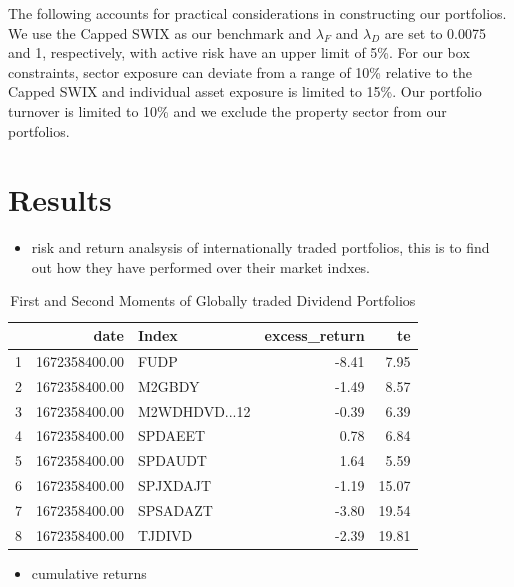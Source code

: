 \documentclass[11pt,preprint, authoryear]{elsarticle}
\numberwithin{equation}{section}
\numberwithin{figure}{section}
\numberwithin{table}{section}
\def\tightlist{} %
\begin{document}
The following accounts for practical considerations in constructing our
portfolios. We use the Capped SWIX as our benchmark and \(\lambda_F\)
and \(\lambda_D\) are set to 0.0075 and 1, respectively, with active
risk have an upper limit of 5\%. For our box constraints, sector
exposure can deviate from a range of 10\% relative to the Capped SWIX
and individual asset exposure is limited to 15\%. Our portfolio turnover
is limited to 10\% and we exclude the property sector from our
portfolios. \newpage

\hypertarget{results}{%
\section*{Results}\label{results}}

\begin{itemize}
\tightlist
\item
  risk and return analsysis of internationally traded portfolios, this
  is to find out how they have performed over their market indxes.
\end{itemize}

\begin{longtable}{rrlrr}
\caption{First and Second Moments of Globally traded Dividend Portfolios \label{tab1}} \\ 
  \hline
 & date & Index & excess\_return & te \\ 
  \hline
1 & 1672358400.00 & FUDP & -8.41 & 7.95 \\ 
  2 & 1672358400.00 & M2GBDY & -1.49 & 8.57 \\ 
  3 & 1672358400.00 & M2WDHDVD...12 & -0.39 & 6.39 \\ 
  4 & 1672358400.00 & SPDAEET & 0.78 & 6.84 \\ 
  5 & 1672358400.00 & SPDAUDT & 1.64 & 5.59 \\ 
  6 & 1672358400.00 & SPJXDAJT & -1.19 & 15.07 \\ 
  7 & 1672358400.00 & SPSADAZT & -3.80 & 19.54 \\ 
  8 & 1672358400.00 & TJDIVD & -2.39 & 19.81 \\ 
   \hline
\hline
\end{longtable}

\begin{itemize}
\tightlist
\item
  cumulative returns
\end{itemize}
\end{document}
